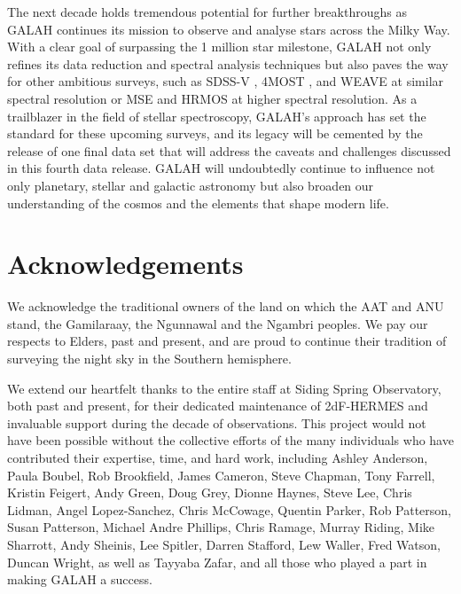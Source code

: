 \documentclass[
  journal=pasa,
  manuscript=research-paper, %
  year=2024,
  volume=37
]{cup-journal}
\begin{document}
The next decade holds tremendous potential for further breakthroughs as GALAH continues its mission to observe and analyse stars across the Milky Way. With a clear goal of surpassing the 1 million star milestone, GALAH not only refines its data reduction and spectral analysis techniques but also paves the way for other ambitious surveys, such as SDSS-V \citep{Kollmeier2017}, 4MOST \citep{4MOST2019}, and WEAVE \citep{Dalton2014} at similar spectral resolution or MSE \citep{MSE2019} and HRMOS \citep{HRMOS2023} at higher spectral resolution. As a trailblazer in the field of stellar spectroscopy, GALAH’s approach has set the standard for these upcoming surveys, and its legacy will be cemented by the release of one final data set that will address the caveats and challenges discussed in this fourth data release. GALAH will undoubtedly continue to influence not only planetary, stellar and galactic astronomy but also broaden our understanding of the cosmos and the elements that shape modern life.


\section*{Acknowledgements}

We acknowledge the traditional owners of the land on which the AAT and ANU stand, the Gamilaraay, the Ngunnawal and the Ngambri peoples. We pay our respects to Elders, past and present, and are proud to continue their tradition of surveying the night sky in the Southern hemisphere.

We extend our heartfelt thanks to the entire staff at Siding Spring Observatory, both past and present, for their dedicated maintenance of 2dF-HERMES and invaluable support during the decade of observations. This project would not have been possible without the collective efforts of the many individuals who have contributed their expertise, time, and hard work, including
Ashley Anderson, 
Paula Boubel, 
Rob Brookfield, 
James Cameron, 
Steve Chapman, 
Tony Farrell, 
Kristin Feigert, 
Andy Green, 
Doug Grey, 
Dionne Haynes, 
Steve Lee, 
Chris Lidman, 
Angel Lopez-Sanchez, 
Chris McCowage, 
Quentin Parker, 
Rob Patterson, 
Susan Patterson, 
Michael Andre Phillips, 
Chris Ramage, 
Murray Riding, 
Mike Sharrott, 
Andy Sheinis, 
Lee Spitler, 
Darren Stafford, 
Lew Waller, 
Fred Watson, 
Duncan Wright, 
as well as Tayyaba Zafar, 
and all those who played a part in making GALAH a success.
\end{document}
